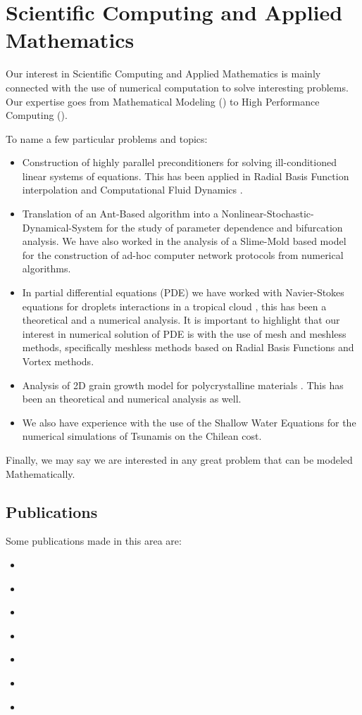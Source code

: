 \section{Scientific Computing and Applied Mathematics}
Our interest in Scientific Computing and Applied Mathematics is
mainly connected with the use of numerical computation to
solve interesting problems. Our expertise goes from
Mathematical Modeling (\cite{Emelianenko2014,Li2011,Li2010,Torres2010}) to High Performance Computing 
(\cite{Emelianenko2014,Torres2012,Torres2009}).

To name a few particular problems and topics:

\begin{itemize}
 \item Construction of highly parallel preconditioners for solving ill-conditioned linear systems of equations.
      This has been applied in Radial Basis Function interpolation \cite{Torres2009} and Computational Fluid Dynamics
      \cite{Torres2012}.
 \item Translation of an Ant-Based algorithm into a Nonlinear-Stochastic-Dynamical-System for the
  study of parameter dependence \cite{Torres2010} and bifurcation analysis.
  We have also worked in the analysis of a Slime-Mold based model for the construction of
  ad-hoc computer network protocols \cite{Li2011,Li2010} from numerical algorithms.
 \item In partial differential equations (PDE) we have worked with Navier-Stokes equations for
  droplets interactions in a tropical cloud \cite{Torres2012}, this has been a theoretical
  and a numerical analysis. 
  It is important to highlight that our interest in numerical solution of PDE 
  is with the use of mesh and meshless methods,
  specifically meshless methods based on Radial Basis Functions and Vortex methods.
 \item Analysis of 2D grain growth model for polycrystalline materials \cite{Emelianenko2014}.
 This has been an theoretical and numerical analysis as well.
 \item We also have experience with the use of the Shallow Water Equations for the 
 numerical simulations of Tsunamis on the Chilean cost.
\end{itemize}

Finally, we may say we are interested in any great problem that can be modeled Mathematically.

\subsection{Publications}

Some publications made in this area are:
\begin{itemize}
\item \cite{Emelianenko2014}
\item \cite{Torres2012}
\item \cite{Wang2011L}
\item \cite{Li2011}
\item \cite{Li2010}
\item \cite{Torres2010}
\item \cite{Torres2009}
\end{itemize}


